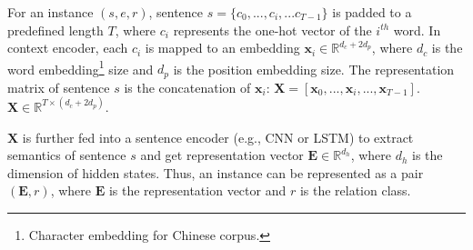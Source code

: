 For an instance $(s,e,r)$, sentence $s=\{c_0,..., c_i, ... c_{T-1}\}$ is padded to a predefined %
length $T$, where $c_i$ represents the one-hot vector of the $i^{th}$ word.
In context encoder, each $c_i$ is mapped to an embedding $\mathbf{x}_i \in \mathbb{R}^{d_c + 2 d_p}$, where $d_c$ is the word embedding\footnote{Character embedding for Chinese corpus.} size and $d_p$ is the position embedding size.
The representation matrix of sentence $s$ is the concatenation of $\mathbf{x}_i$: $\mathbf{X}=[\mathbf{x}_0,..., \mathbf{x}_i, ... ,\mathbf{x}_{T-1}]$. $\mathbf{X} \in \mathbb{R}^{T\times (d_c + 2  d_p)}$.

$\mathbf{X}$ is further fed into a sentence encoder (e.g., CNN or LSTM) to extract semantics of sentence $s$ and get representation vector $\mathbf{E} \in \mathbb{R}^{d_h}$, where $d_h$ is the dimension of hidden states.
Thus, an instance can be represented as a pair $(\mathbf{E},r)$, where $\mathbf{E}$ is the representation vector and $r$ is the relation class.




